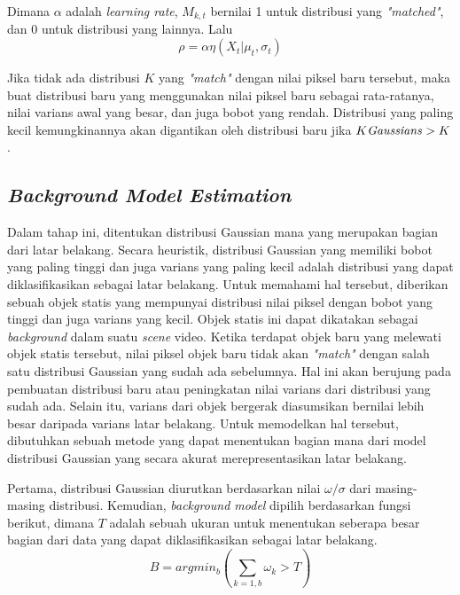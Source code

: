        Dimana $\alpha$ adalah \textit{learning rate}, $M_{k, t}$ bernilai 1 untuk distribusi yang \textit{"matched"}, dan 0 untuk distribusi yang lainnya. Lalu
        \begin{equation}\label{eq:2.11}
        \rho = \alpha\eta(X_t|\mu_t, \sigma_t)
        \end{equation}
        
        Jika tidak ada distribusi $K$ yang \textit{"match"} dengan nilai piksel baru tersebut, maka buat distribusi baru yang menggunakan nilai piksel baru sebagai rata-ratanya, nilai varians awal yang besar, dan juga bobot yang rendah. Distribusi yang paling kecil kemungkinannya akan digantikan oleh distribusi baru jika $K \text{\textit{Gaussians}} > K$.
        
    \subsection{\textit{Background Model Estimation}}
        Dalam tahap ini, ditentukan distribusi Gaussian mana yang merupakan bagian dari latar belakang. Secara heuristik, distribusi Gaussian yang memiliki bobot yang paling tinggi dan juga varians yang paling kecil adalah distribusi yang dapat diklasifikasikan sebagai latar belakang. Untuk memahami hal tersebut, diberikan sebuah objek statis yang mempunyai distribusi nilai piksel dengan bobot yang tinggi dan juga varians yang kecil. Objek statis ini dapat dikatakan sebagai \textit{background} dalam suatu \textit{scene} video. Ketika terdapat objek baru yang melewati objek statis tersebut, nilai piksel objek baru tidak akan \textit{"match"} dengan salah satu distribusi Gaussian yang sudah ada sebelumnya. Hal ini akan berujung pada pembuatan distribusi baru atau peningkatan nilai varians dari distribusi yang sudah ada. Selain itu, varians dari objek bergerak diasumsikan bernilai lebih besar daripada varians latar belakang. Untuk memodelkan hal tersebut, dibutuhkan sebuah metode yang dapat menentukan bagian mana dari model distribusi Gaussian yang secara akurat merepresentasikan latar belakang.
        
        Pertama, distribusi Gaussian diurutkan berdasarkan nilai $\omega/\sigma$ dari masing-masing distribusi. Kemudian, \textit{background model} dipilih berdasarkan fungsi berikut, dimana $T$ adalah sebuah ukuran untuk menentukan seberapa besar bagian dari data yang dapat diklasifikasikan sebagai latar belakang.
        \begin{equation}\label{eq:2.12}
        B = argmin_b (\sum_{k=1, b}\omega_k > T)
        \end{equation}
        
